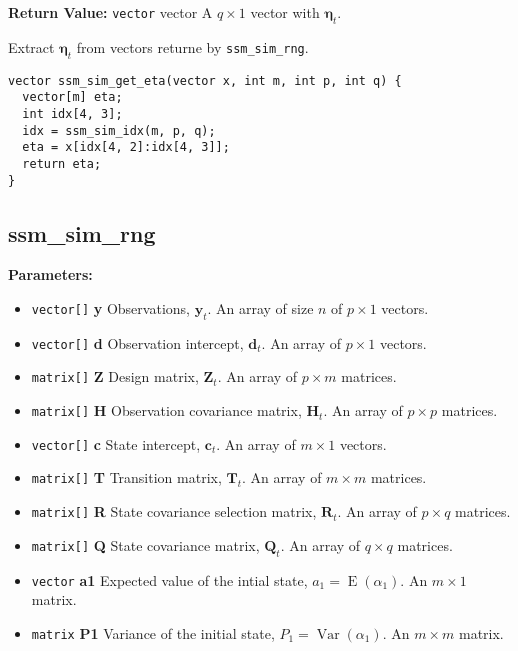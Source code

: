 \documentclass[]{book}
\providecommand{\tightlist}{%
  \setlength{\itemsep}{0pt}\setlength{\parskip}{0pt}}
\DeclareMathOperator{\E}{E}
\DeclareMathOperator{\Var}{Var}
\newcommand{\mat}[1]{\boldsymbol{#1}}
\renewcommand{\vec}[1]{\boldsymbol{#1}}
\begin{document}
\textbf{Return Value:} \texttt{vector} vector A \(q \times 1\) vector
with \(\vec{\eta}_t\).

Extract \(\vec{\eta}_t\) from vectors returne by \texttt{ssm\_sim\_rng}.

\begin{verbatim}
vector ssm_sim_get_eta(vector x, int m, int p, int q) {
  vector[m] eta;
  int idx[4, 3];
  idx = ssm_sim_idx(m, p, q);
  eta = x[idx[4, 2]:idx[4, 3]];
  return eta;
}
\end{verbatim}

\subsection{ssm\_sim\_rng}\label{ssmux5fsimux5frng}

\textbf{Parameters:}

\begin{itemize}
\tightlist
\item
  \texttt{vector{[}{]}} \textbf{y} Observations, \(\vec{y}_t\). An array
  of size \(n\) of \(p \times 1\) vectors.
\item
  \texttt{vector{[}{]}} \textbf{d} Observation intercept, \(\vec{d}_t\).
  An array of \(p \times 1\) vectors.
\item
  \texttt{matrix{[}{]}} \textbf{Z} Design matrix, \(\mat{Z}_t\). An
  array of \(p \times m\) matrices.
\item
  \texttt{matrix{[}{]}} \textbf{H} Observation covariance matrix,
  \(\mat{H}_t\). An array of \(p \times p\) matrices.
\item
  \texttt{vector{[}{]}} \textbf{c} State intercept, \(\vec{c}_t\). An
  array of \(m \times 1\) vectors.
\item
  \texttt{matrix{[}{]}} \textbf{T} Transition matrix, \(\mat{T}_t\). An
  array of \(m \times m\) matrices.
\item
  \texttt{matrix{[}{]}} \textbf{R} State covariance selection matrix,
  \(\mat{R} _t\). An array of \(p \times q\) matrices.
\item
  \texttt{matrix{[}{]}} \textbf{Q} State covariance matrix,
  \(\mat{Q}_t\). An array of \(q \times q\) matrices.
\item
  \texttt{vector} \textbf{a1} Expected value of the intial state,
  \(a_1 = \E(\alpha_1)\). An \(m \times 1\) matrix.
\item
  \texttt{matrix} \textbf{P1} Variance of the initial state,
  \(P_1 = \Var(\alpha_1)\). An \(m \times m\) matrix.
\end{itemize}
\end{document}
